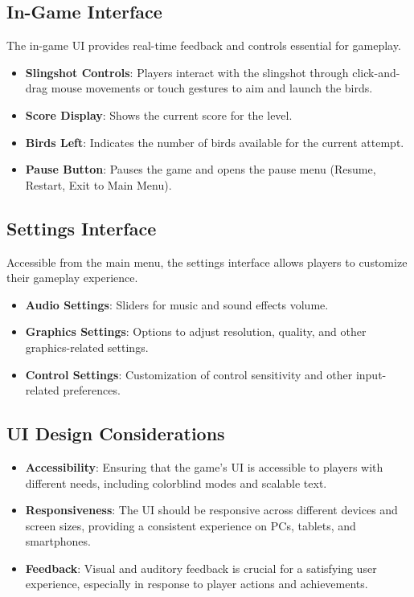 \documentclass[12pt]{article}
\begin{document}
\subsection{In-Game Interface}
The in-game UI provides real-time feedback and controls essential for gameplay.
\begin{itemize}
    \item \textbf{Slingshot Controls}: Players interact with the slingshot through click-and-drag mouse movements or touch gestures to aim and launch the birds.
    \item \textbf{Score Display}: Shows the current score for the level.
    \item \textbf{Birds Left}: Indicates the number of birds available for the current attempt.
    \item \textbf{Pause Button}: Pauses the game and opens the pause menu (Resume, Restart, Exit to Main Menu).
\end{itemize}

\subsection{Settings Interface}
Accessible from the main menu, the settings interface allows players to customize their gameplay experience.
\begin{itemize}
    \item \textbf{Audio Settings}: Sliders for music and sound effects volume.
    \item \textbf{Graphics Settings}: Options to adjust resolution, quality, and other graphics-related settings.
    \item \textbf{Control Settings}: Customization of control sensitivity and other input-related preferences.
\end{itemize}

\subsection{UI Design Considerations}
\begin{itemize}
    \item \textbf{Accessibility}: Ensuring that the game's UI is accessible to players with different needs, including colorblind modes and scalable text.
    \item \textbf{Responsiveness}: The UI should be responsive across different devices and screen sizes, providing a consistent experience on PCs, tablets, and smartphones.
    \item \textbf{Feedback}: Visual and auditory feedback is crucial for a satisfying user experience, especially in response to player actions and achievements.
\end{itemize}
\end{document}
